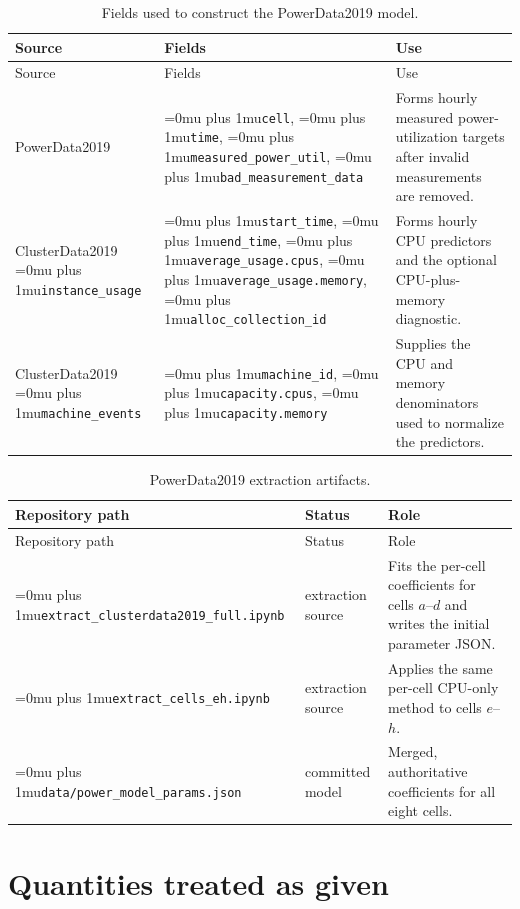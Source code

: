 \documentclass[conference]{IEEEtran}
\newcommand{\codepath}[1]{{\Urlmuskip=0mu plus 1mu\relax\nolinkurl{#1}}}
\begin{document}
\begin{longtable}{@{}L{0.22\textwidth}L{0.30\textwidth}L{0.40\textwidth}@{}}
  \caption{Fields used to construct the PowerData2019 model.}
  \label{tab:powerdata-fields}\\
  \toprule
  Source & Fields & Use \\
  \midrule
  \endfirsthead
  \toprule
  Source & Fields & Use \\
  \midrule
  \endhead
  PowerData2019
    & \codepath{cell}, \codepath{time},
      \codepath{measured_power_util},
      \codepath{bad_measurement_data}
    & Forms hourly measured power-utilization targets after invalid
      measurements are removed. \\
  ClusterData2019 \codepath{instance_usage}
    & \codepath{start_time}, \codepath{end_time},
      \codepath{average_usage.cpus},
      \codepath{average_usage.memory},
      \codepath{alloc_collection_id}
    & Forms hourly CPU predictors and the optional CPU-plus-memory diagnostic. \\
  ClusterData2019 \codepath{machine_events}
    & \codepath{machine_id}, \codepath{capacity.cpus},
      \codepath{capacity.memory}
    & Supplies the CPU and memory denominators used to normalize the predictors. \\
  \bottomrule
\end{longtable}

\begin{longtable}{@{}L{0.34\textwidth}L{0.19\textwidth}L{0.39\textwidth}@{}}
  \caption{PowerData2019 extraction artifacts.}
  \label{tab:powerdata-lineage}\\
  \toprule
  Repository path & Status & Role \\
  \midrule
  \endfirsthead
  \toprule
  Repository path & Status & Role \\
  \midrule
  \endhead
  \codepath{extract_clusterdata2019_full.ipynb}
    & extraction source
    & Fits the per-cell coefficients for cells \(a\)--\(d\) and writes the
      initial parameter JSON. \\
  \codepath{extract_cells_eh.ipynb}
    & extraction source
    & Applies the same per-cell CPU-only method to cells \(e\)--\(h\). \\
  \codepath{data/power_model_params.json}
    & committed model
    & Merged, authoritative coefficients for all eight cells. \\
  \bottomrule
\end{longtable}

\section{Quantities treated as given}
\label{app:given-inputs}
\end{document}
